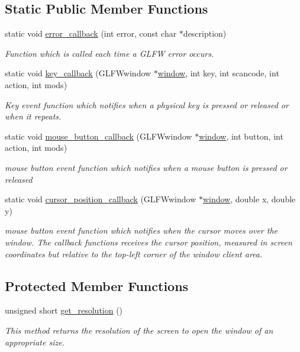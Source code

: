 \subsection*{Static Public Member Functions}
\begin{DoxyCompactItemize}
\item 
static void \hyperlink{class_main_window_a33c07a10c43688414df5cbf157f58a18}{error\+\_\+callback} (int error, const char $\ast$description)
\begin{DoxyCompactList}\small\item\em Function which is called each time a G\+L\+FW error occurs. \end{DoxyCompactList}\item 
static void \hyperlink{class_main_window_a21902b8580ae657fa0dcaa1419a61d68}{key\+\_\+callback} (G\+L\+F\+Wwindow $\ast$\hyperlink{class_main_window_a9fe6b6a6fad9fc0d04a4ebd587c663ae}{window}, int key, int scancode, int action, int mods)
\begin{DoxyCompactList}\small\item\em Key event function which notifies when a physical key is pressed or released or when it repeats. \end{DoxyCompactList}\item 
static void \hyperlink{class_main_window_abf15a739367001229631fa420bf79eb7}{mouse\+\_\+button\+\_\+callback} (G\+L\+F\+Wwindow $\ast$\hyperlink{class_main_window_a9fe6b6a6fad9fc0d04a4ebd587c663ae}{window}, int button, int action, int mods)
\begin{DoxyCompactList}\small\item\em mouse button event function which notifies when a mouse button is pressed or released \end{DoxyCompactList}\item 
static void \hyperlink{class_main_window_aa3b1ac9b22345bb7099347cf42f66ad5}{cursor\+\_\+position\+\_\+callback} (G\+L\+F\+Wwindow $\ast$\hyperlink{class_main_window_a9fe6b6a6fad9fc0d04a4ebd587c663ae}{window}, double x, double y)
\begin{DoxyCompactList}\small\item\em mouse button event function which notifies when the cursor moves over the window. The callback functions receives the cursor position, measured in screen coordinates but relative to the top-\/left corner of the window client area. \end{DoxyCompactList}\end{DoxyCompactItemize}
\subsection*{Protected Member Functions}
\begin{DoxyCompactItemize}
\item 
unsigned short \hyperlink{class_main_window_afb697f0b20242dc01f9c8779382ae53b}{get\+\_\+resolution} ()
\begin{DoxyCompactList}\small\item\em This method returns the resolution of the screen to open the window of an appropriate size. \end{DoxyCompactList}\end{DoxyCompactItemize}
